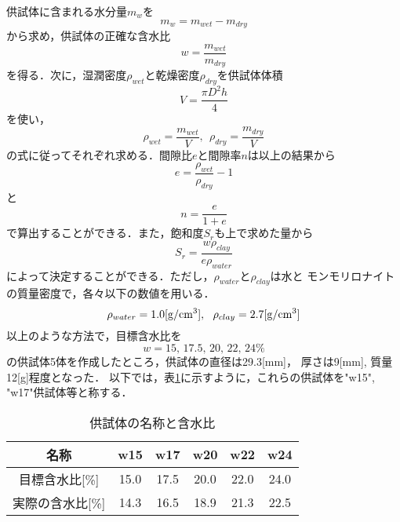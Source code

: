 供試体に含まれる水分量$m_w$を
\begin{equation}
	m_w=m_{wet}-m_{dry}
	\label{eqn:}
\end{equation}
から求め，供試体の正確な含水比
\begin{equation}
	w=\frac{m_{wet}}{m_{dry}}
	\label{eqn:water_content}
\end{equation}
を得る．次に，湿潤密度$\rho_{wet}$と乾燥密度$\rho_{dry}$を供試体体積
\begin{equation}
	V=\frac{\pi D^2h}{4}
	\label{eqn:}
\end{equation}
を使い，
\begin{equation}
	\rho_{wet}=\frac{m_{wet}}{V}, \ \ 
	\rho_{dry}=\frac{m_{dry}}{V}
	\label{eqn:}
\end{equation}
の式に従ってそれぞれ求める．間隙比$e$と間隙率$n$は以上の結果から
\begin{equation}
	e=\frac{\rho_{wet}}{\rho_{dry}} -1
	\label{eqn:}
\end{equation}
と
\begin{equation}
	n=\frac{e}{1+e}
	\label{eqn:}
\end{equation}
で算出することができる．また，飽和度$S_r$も上で求めた量から
\begin{equation}
	S_r=\frac{w\rho_{clay}}{e\rho_{water}}
	\label{eqn:}
\end{equation}
によって決定することができる．ただし，$\rho_{water}$と$\rho_{clay}$は水と
モンモリロナイトの質量密度で，各々以下の数値を用いる．
\begin{equation}
	\rho_{water}=1.0{\rm [g/cm^3]}, \ \ \rho_{clay}=2.7 {\rm [g/cm^3]}
	\label{eqn:}
\end{equation}
以上のような方法で，目標含水比を
\[
	w=15,\, 17.5,\, 20,\, 22,\, 24\%
\]
の供試体5体を作成したところ，供試体の直径は29.3[mm]，
厚さは9[mm], 質量12[g]程度となった．
以下では，表\ref{tbl:samples}に示すように，これらの供試体を"w15", "w17"供試体等と称する．
\begin{table}[h]
\begin{center}
\caption{供試体の名称と含水比}
	\label{tbl:samples}
\begin{tabular}{c||c|c|c|c|c}
\hline
	名称 & w15 & w17 & w20 & w22 & w24 \\
\hline
\hline
	目標含水比[\%] & 15.0 & 17.5 & 20.0 & 22.0 & 24.0 \\
\hline
	実際の含水比[\%] &  14.3 & 16.5 & 18.9 & 21.3 & 22.5  \\
\hline 
\end{tabular}
\end{center}
\end{table}
